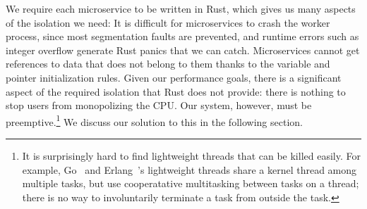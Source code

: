 We require each microservice to be written in Rust, which gives us many aspects of
the isolation we need:  It is difficult for microservices to crash the worker process,
since most segmentation faults are prevented, and runtime errors such as integer
overflow generate Rust panics that we can catch.  Microservices cannot get references
to data that does not belong to them thanks to the variable and pointer initialization
rules.  
Given our performance goals, there is a significant aspect of the
required isolation that Rust does not provide: there is nothing to stop users from
monopolizing the CPU\@.
Our system, however, must be preemptive.\footnote{It is surprisingly hard to find lightweight
  threads that can be killed easily.  For example, 
Go~\cite{www-golang} and Erlang~\cite{www-erlang}'s lightweight threads
share a kernel thread among multiple tasks, but use cooperatative multitasking
between tasks on a thread;  there is no way to involuntarily terminate a task
from outside the task.}  We discuss our solution to this in the following
section.
